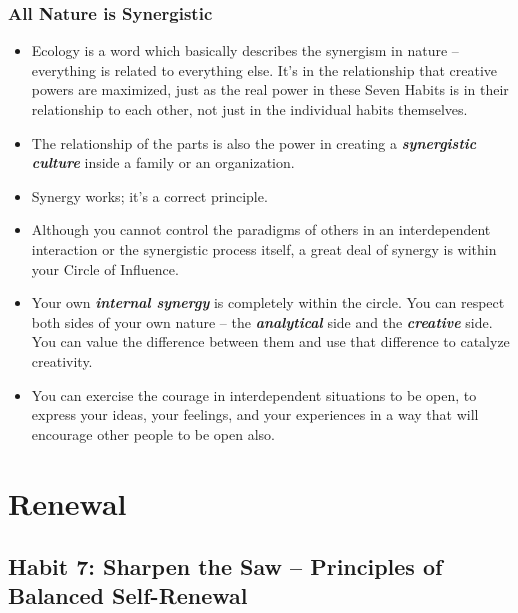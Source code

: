 \documentclass[11pt]{article}
\begin{document}
\subsubsection{All Nature is Synergistic}
\begin{itemize}
\item Ecology is a word which basically describes the synergism in nature -- everything is related to everything else. It's in the relationship that creative powers are maximized, just as the real power in these Seven Habits is in their relationship to each other, not just in the individual habits themselves.

\item The relationship of the parts is also the power in creating a \emph{\textbf{synergistic culture}} inside a family or an organization. 

\item Synergy works; it's a correct principle.
\item Although you cannot control the paradigms of others in an interdependent interaction or the synergistic process itself, a great deal of synergy is within your Circle of Influence.

\item Your own \emph{\textbf{internal synergy}} is completely within the circle. You can respect both sides of your own nature -- the \emph{\textbf{analytical}} side and the \emph{\textbf{creative}} side. You can value the difference between them and use that difference to catalyze creativity.

\item You can exercise the courage in interdependent situations to be open, to express your ideas, your feelings, and your experiences in a way that will encourage other people to be open also.
\end{itemize}
\section{Renewal}
\subsection{Habit 7: Sharpen the Saw -- Principles of Balanced Self-Renewal}
\end{document}
